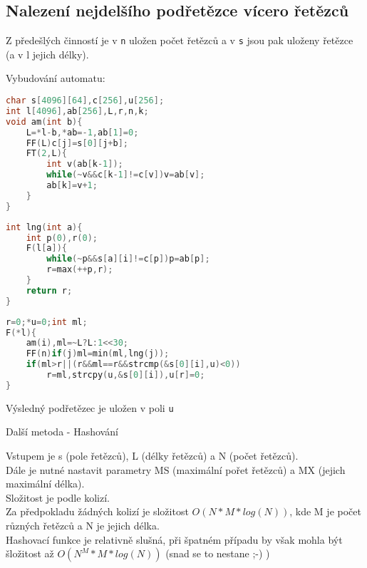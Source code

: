 \documentclass[11pt]{article}
\begin{document}
\subsection{Nalezení nejdelšího podřetězce vícero řetězců}
Z předešlých činností je v \texttt{n} uložen počet řetězců a v \texttt{s} jsou pak uloženy řetězce (a v \textsf{l} jejich délky).
\begin{center}
Vybudování automatu:
\end{center}
\begin{lstlisting}[language=C++]
char s[4096][64],c[256],u[256];
int l[4096],ab[256],L,r,n,k;
void am(int b){
    L=*l-b,*ab=-1,ab[1]=0;
    FF(L)c[j]=s[0][j+b];
    FT(2,L){
        int v(ab[k-1]);
        while(~v&&c[k-1]!=c[v])v=ab[v];
        ab[k]=v+1;
    }
}
\end{lstlisting}
\begin{lstlisting}[language=C++]
int lng(int a){
    int p(0),r(0);
    F(l[a]){
        while(~p&&s[a][i]!=c[p])p=ab[p];
        r=max(++p,r);
    }
    return r;
}
\end{lstlisting}
\begin{lstlisting}[language=C++]
r=0;*u=0;int ml;
F(*l){
    am(i),ml=~L?L:1<<30;
    FF(n)if(j)ml=min(ml,lng(j));
    if(ml>r||(r&&ml==r&&strcmp(&s[0][i],u)<0))
        r=ml,strcpy(u,&s[0][i]),u[r]=0;
}
\end{lstlisting}
Výsledný podřetězec je uložen v poli \texttt{u}
\begin{center}
Další metoda - Hashování
\end{center}
Vstupem je \textsf{s} (pole řetězců), \textsf{L} (délky řetězců) a \textsf{N} (počet řetězců).
\\Dále je nutné nastavit parametry \textsf{MS} (maximální pořet řetězců) a \textsf{MX} (jejich maximální délka).
\\Složitost je podle kolizí.
\\Za předpokladu žádných kolizí je složitost $O(N*M*log(N))$, kde M je počet různých řetězců a N je jejich délka.
\\Hashovací funkce je relativně slušná, při špatném případu by však mohla být šložitost až $O(N^M*M*log(N))$ (snad se to nestane ;-) )
\end{document}
